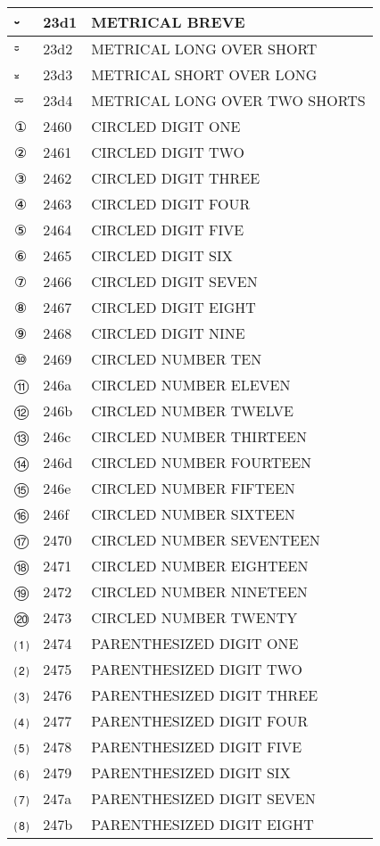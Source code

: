 \documentclass[12pt,letterpaper,openany]{book}
\begin{document}
\begin{center}
\begin{supertabular}{|m{0.25in}|m{0.5in}|m{4in}|}
⏑ & 23d1 & METRICAL BREVE\\\hline
⏒ & 23d2 & METRICAL LONG OVER SHORT\\\hline
⏓ & 23d3 & METRICAL SHORT OVER LONG\\\hline
⏔ & 23d4 & METRICAL LONG OVER TWO SHORTS\\\hline
① & 2460 & CIRCLED DIGIT ONE\\\hline
② & 2461 & CIRCLED DIGIT TWO\\\hline
③ & 2462 & CIRCLED DIGIT THREE\\\hline
④ & 2463 & CIRCLED DIGIT FOUR\\\hline
⑤ & 2464 & CIRCLED DIGIT FIVE\\\hline
⑥ & 2465 & CIRCLED DIGIT SIX\\\hline
⑦ & 2466 & CIRCLED DIGIT SEVEN\\\hline
⑧ & 2467 & CIRCLED DIGIT EIGHT\\\hline
⑨ & 2468 & CIRCLED DIGIT NINE\\\hline
⑩ & 2469 & CIRCLED NUMBER TEN\\\hline
⑪ & 246a & CIRCLED NUMBER ELEVEN\\\hline
⑫ & 246b & CIRCLED NUMBER TWELVE\\\hline
⑬ & 246c & CIRCLED NUMBER THIRTEEN\\\hline
⑭ & 246d & CIRCLED NUMBER FOURTEEN\\\hline
⑮ & 246e & CIRCLED NUMBER FIFTEEN\\\hline
⑯ & 246f & CIRCLED NUMBER SIXTEEN\\\hline
⑰ & 2470 & CIRCLED NUMBER SEVENTEEN\\\hline
⑱ & 2471 & CIRCLED NUMBER EIGHTEEN\\\hline
⑲ & 2472 & CIRCLED NUMBER NINETEEN\\\hline
⑳ & 2473 & CIRCLED NUMBER TWENTY\\\hline
⑴ & 2474 & PARENTHESIZED DIGIT ONE\\\hline
⑵ & 2475 & PARENTHESIZED DIGIT TWO\\\hline
⑶ & 2476 & PARENTHESIZED DIGIT THREE\\\hline
⑷ & 2477 & PARENTHESIZED DIGIT FOUR\\\hline
⑸ & 2478 & PARENTHESIZED DIGIT FIVE\\\hline
⑹ & 2479 & PARENTHESIZED DIGIT SIX\\\hline
⑺ & 247a & PARENTHESIZED DIGIT SEVEN\\\hline
⑻ & 247b & PARENTHESIZED DIGIT EIGHT\\\hline

\end{supertabular}
\end{center}
\end{document}
